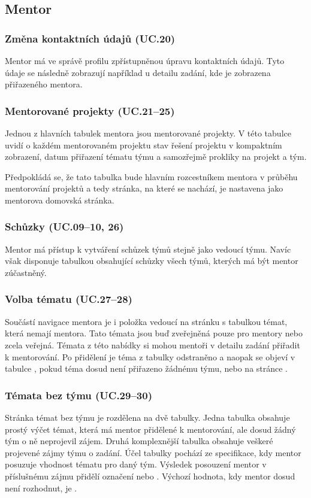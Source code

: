 \documentclass[czech,BP]{thesiskiv}
\begin{document}
		\subsection{Mentor}
			\subsubsection{Změna kontaktních údajů (UC.20)}
				\par Mentor má ve správě profilu zpřístupněnou úpravu kontaktních údajů. Tyto údaje se následně zobrazují například u detailu zadání, kde je zobrazena  přiřazeného mentora.
			\subsubsection{Mentorované projekty (UC.21--25)}
				\par Jednou z hlavních tabulek mentora jsou mentorované projekty. V této tabulce uvidí o každém mentorovaném projektu stav řešení projektu v kompaktním zobrazení, datum přiřazení tématu týmu a samozřejmě prokliky na projekt a tým.
				\par Předpokládá se, že tato tabulka bude hlavním rozcestníkem mentora v průběhu mentorování projektů a tedy stránka, na které se nachází, je nastavena jako mentorova domovská stránka.
			\subsubsection{Schůzky (UC.09--10, 26)}
				\par Mentor má přístup k vytváření schůzek týmů stejně jako vedoucí týmu. Navíc však disponuje tabulkou obsahující schůzky všech týmů, kterých má být mentor zúčastněný.
			\subsubsection{Volba tématu (UC.27--28)}
				\par Součástí navigace mentora je i položka  vedoucí na stránku s tabulkou témat, která nemají mentora. Tato témata jsou buď zveřejněná pouze pro mentory nebo zcela veřejná. Témata z této nabídky si mohou mentoři v detailu zadání přiřadit k mentorování. Po přidělení je téma z tabulky odstraněno a naopak se objeví v tabulce , pokud téma dosud není přiřazeno žádnému týmu, nebo na stránce .
			\subsubsection{Témata bez týmu (UC.29--30)}
				\par Stránka témat bez týmu je rozdělena na dvě tabulky. Jedna tabulka obsahuje prostý výčet témat, která má mentor přidělené k mentorování, ale dosud žádný tým o ně neprojevil zájem. Druhá komplexnější tabulka obsahuje veškeré projevené zájmy týmu o zadání. Účel tabulky pochází ze specifikace, kdy mentor posuzuje vhodnost tématu pro daný tým. Výsledek posouzení mentor v příslušnému zájmu přidělí označení  nebo . Výchozí hodnota, kdy mentor dosud není rozhodnut, je .
\end{document}

